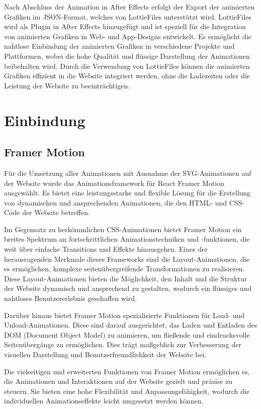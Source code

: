 Nach Abschluss der Animation in After Effects erfolgt der Export der animierten Grafiken im JSON-Format, welches von LottieFiles 
unterstützt wird. LottieFiles wird als Plugin in After Effects hinzugefügt und ist speziell für die Integration von animierten Grafiken in Web- und 
App-Designs entwickelt. Es ermöglicht die nahtlose Einbindung der animierten Grafiken in verschiedene Projekte und Plattformen, 
wobei die hohe Qualität und flüssige Darstellung der Animationen beibehalten wird. Durch die Verwendung von LottieFiles können die 
animierten Grafiken effizient in die Website integriert werden, ohne die Ladezeiten oder die Leistung der Website zu beeinträchtigen.


\section{Einbindung} \label{sec:animationen:Einbindung}

\subsection{Framer Motion}
Für die Umsetzung aller Animationen mit Ausnahme der SVG-Animationen auf der Website wurde das Animationsframework für React
Framer Motion ausgewählt. Es bietet eine leistungsstarke und flexible Lösung für 
die Erstellung von dynamischen und ansprechenden Animationen, die den HTML- und CSS-Code der Website betreffen.

Im Gegensatz zu herkömmlichen CSS-Animationen bietet Framer Motion ein breites Spektrum an fortschrittlichen 
Animationstechniken und -funktionen, die weit über einfache Transitions und Effekte hinausgehen. Eines der herausragenden 
Merkmale dieses Frameworks sind die Layout-Animationen, die es ermöglichen, komplexe seitenübergreifende Transformationen zu realisieren. 
Diese Layout-Animationen bieten die Möglichkeit, den Inhalt und die Struktur der Website dynamisch und ansprechend zu gestalten, 
wodurch ein flüssiges und nahtloses Benutzererlebnis geschaffen wird.

Darüber hinaus bietet Framer Motion spezialisierte Funktionen für Load- und Unload-Animationen. Diese sind darauf 
ausgerichtet, das Laden und Entladen des DOM (Document Object Model) zu animieren, um fließende und eindrucksvolle Seitenübergänge 
zu ermöglichen. Dies trägt maßgeblich zur Verbesserung der visuellen Darstellung und Benutzerfreundlichkeit der Website bei.

Die vielseitigen und erweiterten Funktionen von Framer Motion ermöglichen es, die Animationen und Interaktionen auf der 
Website gezielt und präzise zu steuern. Sie bieten eine hohe Flexibilität und Anpassungsfähigkeit, wodurch die individuellen 
 Animationseffekte leicht umgesetzt werden können.

